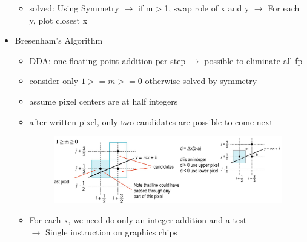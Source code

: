 \documentclass[11pt,a4paper]{article}
\begin{document}
\begin{itemize}
\begin{itemize}
					\item solved: Using Symmetry $\rightarrow$ if m$>$1, swap role of x and y $\rightarrow$ For each y, plot closest x
				\end{itemize}
			\item Bresenham’s Algorithm
				\begin{itemize}
					\item DDA: one floating point addition per step $\rightarrow$ possible to eliminate all fp
					\item consider only $1>=m>=0$ otherwise solved by symmetry
					\item assume pixel centers are at half integers
					\item after written pixel, only two candidates are possible to come next
						\begin{figure}[h]
							\hspace{-2.0cm}
							\includegraphics[scale=0.4]{pictures/BresenhamsAlgorithmPixels.jpg}
						\end{figure}
					\item For each x, we need do only an integer addition and a test\\
					$\rightarrow$ Single instruction on graphics chips
				\end{itemize}
		\end{itemize}
\end{document}
